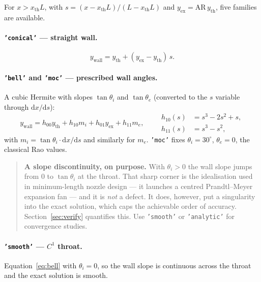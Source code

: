 \documentclass[11pt,a4paper]{article}
\newcommand{\code}[1]{\texttt{#1}}
\begin{document}
For $x > x_{\mathrm{th}} L$, with $s = (x - x_{\mathrm{th}}L)/(L - x_{\mathrm{th}}L)$
and $y_{\mathrm{ex}} = \mathrm{AR}\,y_{\mathrm{th}}$, five families are available.

\paragraph{\code{'conical'} --- straight wall.}
\begin{equation}
  y_{\mathrm{wall}} = y_{\mathrm{th}} + (y_{\mathrm{ex}} - y_{\mathrm{th}})\, s .
\end{equation}

\paragraph{\code{'bell'} and \code{'moc'} --- prescribed wall angles.}
A cubic Hermite with slopes $\tan\theta_i$ and $\tan\theta_e$ (converted to the
$s$ variable through $\mathrm{d}x/\mathrm{d}s$):
\begin{equation}
  y_{\mathrm{wall}} = h_{00} y_{\mathrm{th}} + h_{10} m_i
                    + h_{01} y_{\mathrm{ex}} + h_{11} m_e ,
  \qquad
  \begin{aligned}
    h_{10}(s) &= s^{3} - 2s^{2} + s, \\
    h_{11}(s) &= s^{3} - s^{2},
  \end{aligned}
  \label{eq:bell}
\end{equation}
with $m_i = \tan\theta_i \cdot \mathrm{d}x/\mathrm{d}s$ and similarly for $m_e$.
\code{'moc'} fixes $\theta_i = 30^{\circ}$, $\theta_e = 0$, the classical
Rao values.

\begin{quote}
\textbf{A slope discontinuity, on purpose.}  With $\theta_i > 0$ the wall slope
jumps from $0$ to $\tan\theta_i$ at the throat.  That sharp corner is the
idealisation used in minimum-length nozzle design --- it launches a centred
Prandtl--Meyer expansion fan --- and it is \emph{not} a defect.  It does,
however, put a singularity into the exact solution, which caps the achievable
order of accuracy.  Section~\ref{sec:verify} quantifies this.  Use
\code{'smooth'} or \code{'analytic'} for convergence studies.
\end{quote}

\paragraph{\code{'smooth'} --- $C^1$ throat.}
Equation~\eqref{eq:bell} with $\theta_i = 0$, so the wall slope is continuous
across the throat and the exact solution is smooth.
\end{document}

